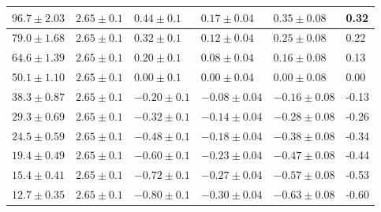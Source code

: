 \begin{enumerate}
\begin{maintable}[ht]
\begin{tabular}{|l|l|l|l|l|l|}
$96.7\pm2.03$                          & $2.65\pm0.1$                   & $0.44\pm0.1$                   & $0.17\pm0.04$                   & $0.35\pm0.08$                        & 0.32                                   \\ \hline
$79.0\pm1.68$                          & $2.65\pm0.1$                   & $0.32\pm0.1$                   & $0.12\pm0.04$                   & $0.25\pm0.08$                        & 0.22                                   \\ \hline
$64.6\pm1.39$                          & $2.65\pm0.1$                   & $0.20\pm0.1$                   & $0.08\pm0.04$                   & $0.16\pm0.08$                        & 0.13                                   \\ \hline
$50.1\pm1.10$                          & $2.65\pm0.1$                   & $0.00\pm0.1$                   & $0.00\pm0.04$                   & $0.00\pm0.08$                        & 0.00                                   \\ \hline
$38.3\pm0.87$                          & $2.65\pm0.1$                   & $-0.20\pm0.1$                  & $-0.08\pm0.04$                  & $-0.16\pm0.08$                       & -0.13                                  \\ \hline
$29.3\pm0.69$                          & $2.65\pm0.1$                   & $-0.32\pm0.1$                  & $-0.14\pm0.04$                  & $-0.28\pm0.08$                       & -0.26                                  \\ \hline
$24.5\pm0.59$                          & $2.65\pm0.1$                   & $-0.48\pm0.1$                  & $-0.18\pm0.04$                  & $-0.38\pm0.08$                       & -0.34                                  \\ \hline
$19.4\pm0.49$                          & $2.65\pm0.1$                   & $-0.60\pm0.1$                   & $-0.23\pm0.04$                  & $-0.47\pm0.08$                       & -0.44                                  \\ \hline
$15.4\pm0.41$                          & $2.65\pm0.1$                   & $-0.72\pm0.1$                  & $-0.27\pm0.04$                  & $-0.57\pm0.08$                       & -0.53                                  \\ \hline
$12.7\pm0.35$                          & $2.65\pm0.1$                   & $-0.80\pm0.1$                  & $-0.30\pm0.04$                  & $-0.63\pm0.08$                       & -0.60                                  \\ \hline

\end{tabular}
\end{maintable}
\end{enumerate}
